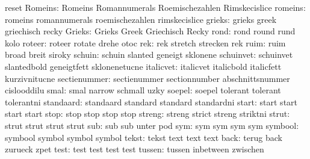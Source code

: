                       reset
            Romeins:  Romeins              Romannumerals       Roemischezahlen
                      Rimskecislice
            romeins:  romeins              romannumerals       roemischezahlen
                      rimskecislice
             grieks:  grieks               greek               griechisch
                      recky
             Grieks:  Grieks               Greek               Griechisch
                      Recky
               rond:  rond                 round               rund
                      kolo
             roteer:  roteer               rotate              drehe
                      otoc
                rek:  rek                  stretch             strecken
                      rek %
               ruim:  ruim                 broad               breit
                      siroky
             schuin:  schuin               slanted             geneigt
                      sklonene
          schuinvet:  schuinvet            slantedbold         geneigtfett
                      sklonenetucne
          italicvet:  italicvet            italicbold          italicfett
                      kurzivnitucne
       sectienummer:  sectienummer         sectionnumber       abschnittsnummer
                      cislooddilu
               smal:  smal                 narrow              schmall
                      uzky
             soepel:  soepel               tolerant            tolerant
                      tolerantni
          standaard:  standaard            standard            standard
                      standardni
              start:  start                start               start
                      start
               stop:  stop                 stop                stop
                      stop
             streng:  streng               strict              streng
                      striktni
              strut:  strut                strut               strut
                      strut 
                sub:  sub                  sub                 unter
                      pod
                sym:  sym                  sym                 sym
                      sym
            symbool:  symbool              symbol              symbol
                      symbol
              tekst:  tekst                text                text
                      text
               back:  terug                back                zurueck
                      zpet
               test:  test                 test                test
                      test
             tussen:  tussen               inbetween           zwischen
